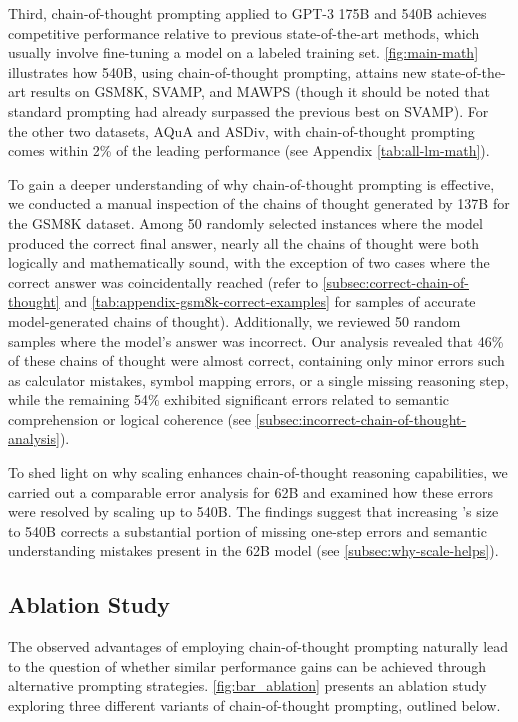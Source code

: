 Third, chain-of-thought prompting applied to GPT-3 175B and \palm{} 540B achieves competitive performance relative to previous state-of-the-art methods, which usually involve fine-tuning a model on a labeled training set. \cref{fig:main-math} illustrates how \palm{} 540B, using chain-of-thought prompting, attains new state-of-the-art results on GSM8K, SVAMP, and MAWPS (though it should be noted that standard prompting had already surpassed the previous best on SVAMP). For the other two datasets, AQuA and ASDiv, \palm{} with chain-of-thought prompting comes within 2\% of the leading performance (see Appendix \cref{tab:all-lm-math}).

To gain a deeper understanding of why chain-of-thought prompting is effective, we conducted a manual inspection of the chains of thought generated by \lamda{} 137B for the GSM8K dataset. Among 50 randomly selected instances where the model produced the correct final answer, nearly all the chains of thought were both logically and mathematically sound, with the exception of two cases where the correct answer was coincidentally reached (refer to \cref{subsec:correct-chain-of-thought} and \cref{tab:appendix-gsm8k-correct-examples} for samples of accurate model-generated chains of thought). Additionally, we reviewed 50 random samples where the model's answer was incorrect. Our analysis revealed that 46\% of these chains of thought were almost correct, containing only minor errors such as calculator mistakes, symbol mapping errors, or a single missing reasoning step, while the remaining 54\% exhibited significant errors related to semantic comprehension or logical coherence (see \cref{subsec:incorrect-chain-of-thought-analysis}).

To shed light on why scaling enhances chain-of-thought reasoning capabilities, we carried out a comparable error analysis for \palm{} 62B and examined how these errors were resolved by scaling up to \palm{} 540B. The findings suggest that increasing \palm{}’s size to 540B corrects a substantial portion of missing one-step errors and semantic understanding mistakes present in the 62B model (see \cref{subsec:why-scale-helps}).

\subsection{Ablation Study}\label{subsec:math-ablation}

The observed advantages of employing chain-of-thought prompting naturally lead to the question of whether similar performance gains can be achieved through alternative prompting strategies. \cref{fig:bar_ablation} presents an ablation study exploring three different variants of chain-of-thought prompting, outlined below.

